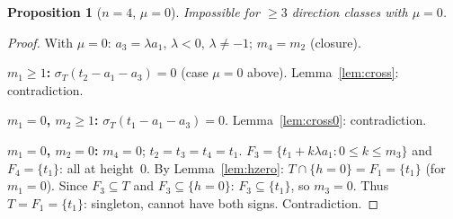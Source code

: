 \documentclass{article}
\newtheorem{prop}{Proposition}
\begin{document}
\begin{prop}[$n=4$, $\mu=0$]\label{prop:n4mu0}
Impossible for $\ge 3$ direction classes with $\mu=0$.
\end{prop}
\begin{proof}
With $\mu=0$: $a_3=\lambda a_1$, $\lambda<0$, $\lambda\ne-1$; $m_4=m_2$ (closure).

\textbf{$m_1\ge 1$:} $\sigma_T(t_2-a_1-a_3)=0$ (case $\mu=0$ above). Lemma~\ref{lem:cross}: contradiction.

\textbf{$m_1=0$, $m_2\ge 1$:} $\sigma_T(t_1-a_1-a_3)=0$. Lemma~\ref{lem:cross0}: contradiction.

\textbf{$m_1=0$, $m_2=0$:}
$m_4=0$; $t_2=t_3=t_4=t_1$.
$F_3=\{t_1+k\lambda a_1:0\le k\le m_3\}$ and $F_4=\{t_1\}$: all at height~$0$.
By Lemma~\ref{lem:hzero}: $T\cap\{h=0\}=F_1=\{t_1\}$ (for $m_1=0$).
Since $F_3\subseteq T$ and $F_3\subseteq\{h=0\}$: $F_3\subseteq\{t_1\}$, so $m_3=0$.
Thus $T=F_1=\{t_1\}$: singleton, cannot have both signs.  Contradiction.
\end{proof}
\end{document}
